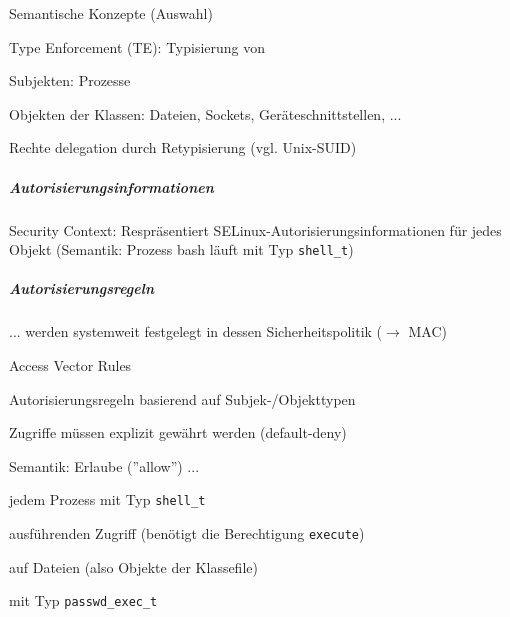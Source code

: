 \documentclass[a4paper]{article}
\begin{document}
\begin{multicols}{3}
    Semantische Konzepte (Auswahl)
    \begin{itemize*}
        \item Type Enforcement (TE): Typisierung von
        \begin{itemize*}
            \item Subjekten: Prozesse
            \item Objekten der Klassen: Dateien, Sockets, Geräteschnittstellen, ...
        \end{itemize*}
        \item Rechte delegation durch Retypisierung (vgl. Unix-SUID)
    \end{itemize*}

    \subparagraph{Autorisierungsinformationen}
    Security Context: Respräsentiert SELinux-Autorisierungsinformationen für jedes Objekt (Semantik: Prozess bash läuft mit Typ \texttt{shell\_t})

    \subparagraph{Autorisierungsregeln}
    ... werden systemweit festgelegt in dessen Sicherheitspolitik ($\rightarrow$ MAC)

    Access Vector Rules
    \begin{itemize*}
        \item Autorisierungsregeln basierend auf Subjek-/Objekttypen
        \item Zugriffe müssen explizit gewährt werden (default-deny)
        \item Semantik: Erlaube (''allow'') ...
        \begin{itemize*}
            \item jedem Prozess mit Typ \texttt{shell\_t}
            \item ausführenden Zugriff (benötigt die Berechtigung \texttt{execute})
            \item auf Dateien (also Objekte der Klassefile)
            \item mit Typ \texttt{passwd\_exec\_t}
        \end{itemize*}
    \end{itemize*}


\end{multicols}
\end{document}
